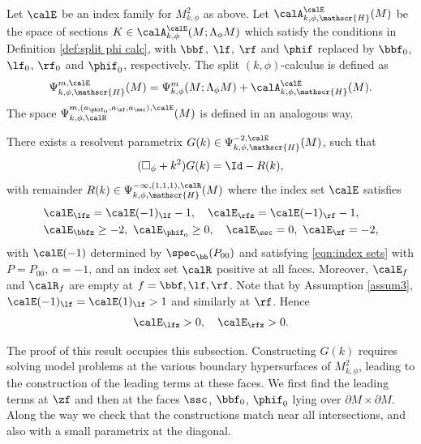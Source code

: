 \begin{defn}\label{def:split k phi calculus}
Let $\calE$ be an index family for $M^2_{k,\phi}$ as above.
Let $\calA^\calE_{k,\phi,\mathscr{H}}(M)$ be the space of sections $K\in \calA^{\calE}_{k,\phi}(M;\Lambda_\phi M)$ which satisfy the conditions in Definition \ref{def:split phi calc}, with $\bbf$, $\lf$, $\rf$ and $\phif$ replaced by $\bbf_0$, $\lf_0$, $\rf_0$ and
$\phif_0$, respectively. The split $(k,\phi)$-calculus is defined as
\[
\Psi^{m,\calE}_{k,\phi,\mathscr{H}}(M) = \Psi^{m}_{k,\phi}(M;\Lambda_\phi M) +
\calA^\calE_{k,\phi,\mathscr{H}}(M).
\]
The space $\Psi_{k,\phi,\calH}^{m,(a_{\phif_0}, a_\zf,a_\ssc),\calE}(M)$ is defined in an analogous way.

\end{defn}

\label{subsec:intl param}

\begin{Th}\label{initial resl phi}
There exists a resolvent parametrix $G(k)\in \Psi^{-2,\calE}_{k,\phi,\mathscr{H}}(M)$,
such that
\[
(\square_\phi+k^2) G(k) = \Id - R(k),
\]
with remainder $R(k)\in \Psi^{-\infty,(1,1,1),\calR}_{k,\phi,\mathscr{H}}(M)$
where the index set $\calE$ satisfies
\begin{equation}
\label{eqn:ind set k phi para}
\begin{split}
&\calE_{\lfz}=\calE(-1)_\lf-1,\quad \calE_\rfz=\calE(-1)_\rf-1,
\\ &\calE_\bbfz\geq-2,\ \calE_{\phif_0}\geq0,\quad \calE_\ssc=0,\ \calE_\zf=-2,
\end{split}
\end{equation}
with $\calE(-1)$ determined by $\spec_\bb(P_{00})$ and satisfying \eqref{eqn:index sets}
with $P=P_{00}$, $\alpha=-1$, and an index set $\calR$ positive at all faces.
Moreover, $\calE_f$ and $\calR_f$ are empty at $f=\bbf,\lf,\rf$. Note that by Assumption
\ref{assum3}, $\calE(-1)_\lf= \calE(1)_\lf > 1$ and similarly at $\rf$. Hence
\begin{equation}
\label{eqn: lf rf positive}
\calE_{\lfz}>0,\quad \calE_\rfz>0.
\end{equation}

\end{Th}

The proof of this result occupies this subsection.
Constructing $G(k)$ requires solving model problems at the various boundary
hypersurfaces of $M^2_{k,\phi}$, leading to the construction of the leading terms at these faces.
We first find the leading terms at $\zf$ and then at the faces $\ssc$, $\bbf_0$, $\phif_0$ lying over $\partial M\times\partial M$. Along the way we check that the constructions match near all intersections, and also with a small parametrix at the diagonal.

